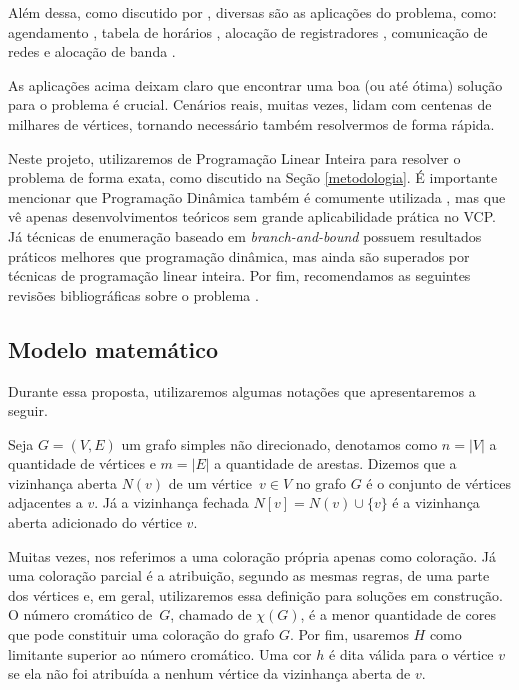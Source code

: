 \documentclass[11pt]{article}
\begin{document}
Além dessa, como discutido por \textcite{Malaguti2010surveyvertexcoloring}, diversas são as aplicações do problema, como: agendamento \autocite{Leighton1979GraphColoringAlgorithm}, tabela de horários \autocite{Werra1985introductiontimetabling}, alocação de registradores \autocite{Chow1990prioritybasedcoloring}, comunicação de redes \autocite{Caprara2007PassengerRailwayOptimization} e alocação de banda \autocite{Gamst1986Somelowerbounds}.

As aplicações acima deixam claro que encontrar uma boa (ou até ótima) solução para o problema é crucial.
Cenários reais, muitas vezes, lidam com centenas de milhares de vértices, tornando necessário também resolvermos de forma rápida.

Neste projeto, utilizaremos de Programação Linear Inteira para resolver o problema de forma exata, como discutido na Seção \ref{metodologia}.
É importante mencionar que Programação Dinâmica também é comumente utilizada \autocites{Eppstein2006SmallMaximalIndependent}[][]{Byskov2002ChromaticNumberTime}, mas que vê apenas desenvolvimentos teóricos sem grande aplicabilidade prática no VCP.
Já técnicas de enumeração baseado em \emph{branch-and-bound} \autocite{Brelaz1979Newmethodscolor} possuem resultados práticos melhores que programação dinâmica, mas ainda são superados por técnicas de programação linear inteira.
Por fim, recomendamos as seguintes revisões bibliográficas sobre o problema  \autocites{Malaguti2010surveyvertexcoloring}[][]{Lewis2015GuideGraphColouring}[][]{Husfeldt2015Graphcolouringalgorithms}[][]{Lima2018ExactAlgorithmsGraph}.

\subsection{Modelo matemático}
\label{sec:org94e3d32}
Durante essa proposta, utilizaremos algumas notações que apresentaremos a seguir.

Seja \(G = (V,E)\) um grafo simples não direcionado, denotamos como \(n = |V|\) a quantidade de vértices e \(m = |E|\) a quantidade de arestas.
Dizemos que a vizinhança aberta \(N(v)\) de um vértice~\(v \in V\) no grafo \(G\) é o conjunto de vértices adjacentes a \(v\).
Já a vizinhança fechada \(N[v] = N(v) \cup \{v\}\) é a vizinhança aberta adicionado do vértice \(v\).

Muitas vezes, nos referimos a uma coloração própria apenas como coloração.
Já uma coloração parcial é a atribuição, segundo as mesmas regras, de uma parte dos vértices e, em geral, utilizaremos essa definição para soluções em construção.
O número cromático de~\(G\), chamado de \(\chi(G)\), é a menor quantidade de cores que pode constituir uma coloração do grafo \(G\).
Por fim, usaremos \(H\) como limitante superior ao número cromático.
Uma cor \(h\) é dita válida para o vértice \(v\) se ela não foi atribuída a nenhum vértice da vizinhança aberta de \(v\).
\end{document}
